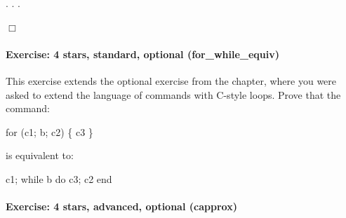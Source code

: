\documentclass[12pt]{report}
\begin{document}
\begin{coqdoccode}
\coqdocindent{2.00em}
       .\coqdoceol
\coqdocnoindent
{}.\coqdoceol
 .\coqdoceol
\end{coqdoccode}
\ensuremath{\Box} 

\paragraph{Exercise: 4 stars, standard, optional (for\_while\_equiv)}




    This exercise extends the optional  exercise from
    the  chapter, where you were asked to extend the language
    of commands with C-style  loops.  Prove that the command:


      for (c1; b; c2) \{
          c3
      \}


    is equivalent to:


       c1;
       while b do
         c3;
         c2
       end

\begin{coqdoccode}
\coqdocemptyline
\end{coqdoccode}
\paragraph{Exercise: 4 stars, advanced, optional (capprox)}
\end{document}
